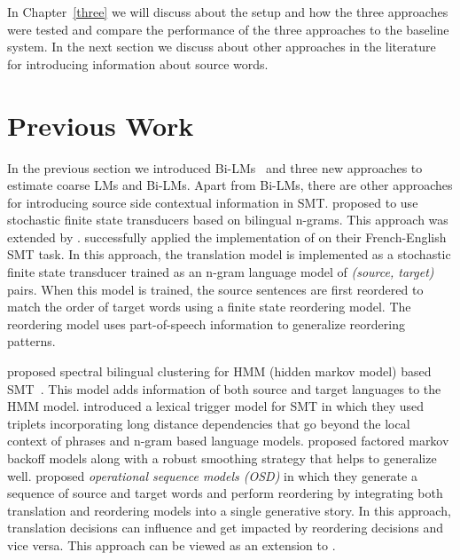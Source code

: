 
In Chapter~\ref{three} we will discuss about the setup and how the three approaches were tested and compare the performance of the three approaches to the baseline system. In the next section we discuss about other approaches in the literature for introducing information about source words.

\section{Previous Work}
In the previous section we introduced Bi-LMs~\cite{Niehues2011,Stewart2014} and three new approaches to estimate coarse LMs and Bi-LMs. Apart from Bi-LMs, there are other approaches for introducing source side contextual information in SMT. \cite{Casacuberta2004} proposed to use stochastic finite state transducers based on bilingual n-grams. This approach was extended by \cite{Marino2006,Crego2010,Zhang2013}. \cite{Allauzen2010} successfully applied the implementation of \cite{Marino2006} on their French-English SMT task. In this approach, the translation model is implemented as a stochastic finite state transducer trained as an n-gram language model of \textit{(source, target)} pairs. When this model is trained, the source sentences are first reordered to match the order of target words using a finite state reordering model. The reordering model uses part-of-speech information to generalize reordering patterns.

\cite{Zhao2005} proposed spectral bilingual clustering for HMM (hidden markov model) based SMT~\cite{Och2003}. This model adds information of both source and target languages to the HMM model. \cite{Hasan2008} introduced a lexical trigger model for SMT in which they used triplets incorporating long distance dependencies that go beyond the local context of phrases and n-gram based language models. \cite{Feng2014} proposed factored markov backoff models along with a robust smoothing strategy that helps to generalize well. \cite{Durrani2011,Durrani2014} proposed \textit{operational sequence models (OSD)} in which they generate a sequence of source and target words and perform reordering by integrating both translation and reordering models into a single generative story. In this approach, translation decisions can influence and get impacted by reordering decisions and vice versa. This approach can be viewed as an extension to \cite{Casacuberta2004,Marino2006}.


